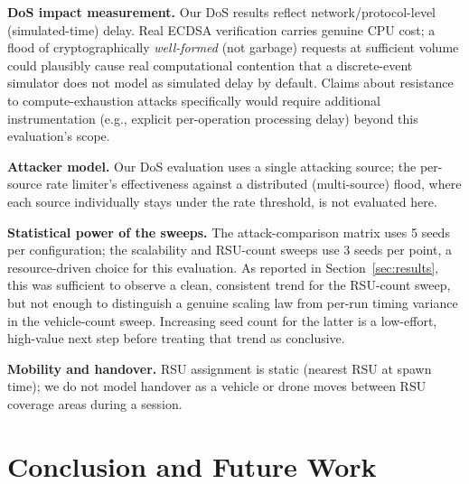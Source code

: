\documentclass[conference]{IEEEtran}
\begin{document}
\textbf{DoS impact measurement.} Our DoS results reflect
network/protocol-level (simulated-time) delay. Real ECDSA
verification carries genuine CPU cost; a flood of cryptographically
\emph{well-formed} (not garbage) requests at sufficient volume could
plausibly cause real computational contention that a discrete-event
simulator does not model as simulated delay by default. Claims about
resistance to compute-exhaustion attacks specifically would require
additional instrumentation (e.g., explicit per-operation processing
delay) beyond this evaluation's scope.

\textbf{Attacker model.} Our DoS evaluation uses a single attacking
source; the per-source rate limiter's effectiveness against a
distributed (multi-source) flood, where each source individually
stays under the rate threshold, is not evaluated here.

\textbf{Statistical power of the sweeps.} The attack-comparison matrix
uses 5 seeds per configuration; the scalability and RSU-count sweeps
use 3 seeds per point, a resource-driven choice for this evaluation.
As reported in Section~\ref{sec:results}, this was sufficient to
observe a clean, consistent trend for the RSU-count sweep, but not
enough to distinguish a genuine scaling law from per-run timing
variance in the vehicle-count sweep. Increasing seed count for the
latter is a low-effort, high-value next step before treating that
trend as conclusive.

\textbf{Mobility and handover.} RSU assignment is static (nearest RSU
at spawn time); we do not model handover as a vehicle or drone moves
between RSU coverage areas during a session.

\section{Conclusion and Future Work}
\end{document}
